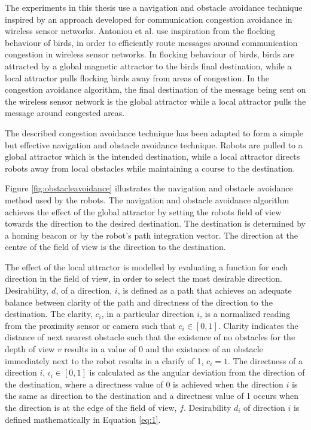 The experiments in this thesis use a navigation and obstacle avoidance technique inspired by an approach developed for communication congestion avoidance in wireless sensor networks\cite{antoniou2012congestion}. Antoniou et al. use inspiration from the flocking behaviour of birds, in order to efficiently route messages around communication congestion in wireless sensor networks. In flocking behaviour of birds, birds are attracted by a global magnetic attractor to the birds final destination, while a local attractor pulls flocking birds away from areas of congestion. In the congestion avoidance algorithm, the final destination of the message being sent on the wireless sensor network is the global attractor while a local attractor pulls the message around congested areas.

The described congestion avoidance technique has been adapted to form a simple but effective navigation and obstacle avoidance technique. Robots are pulled to a global attractor which is the intended destination, while a local attractor directs robots away from local obstacles while maintaining a course to the destination.

Figure \ref{fig:obstacleavoidance} illustrates the navigation and obstacle avoidance method used by the robots. The navigation and obstacle avoidance algorithm achieves the effect of the global attractor by setting the robots field of view towards the direction to the desired destination. The destination is determined by a homing beacon or by the robot's path integration vector. The direction at the centre of the field of view is the direction to the destination. 

The effect of the local attractor is modelled by evaluating a function for each direction in the field of view, in order to select the most desirable direction. Desirability, $d$, of a direction, $i$, is defined as a path that achieves an adequate balance between clarity of the path and directness of the direction to the destination. The clarity,  $c_i$, in a particular direction $i$, is a normalized reading from the proximity sensor or camera such that $c_i\in[0,1]$. Clarity indicates the distance of next nearest obstacle such that the existence of no obstacles for the depth of view $v$ results in a value of 0 and the existance of an obstacle immediately next to the robot results in a clarify of 1, $c_i=1$. The directness of a direction $i$, $\iota_i\in[0,1]$ is calculated as the angular deviation from the direction of the destination, where a directness value of 0 is achieved when the direction $i$ is the same as direction to the destination and a directness value of 1 occurs when the direction is at the edge of the field of view, $f$. Desirability $d_i$ of direction $i$ is defined mathematically in Equation \ref{eq:1}.

